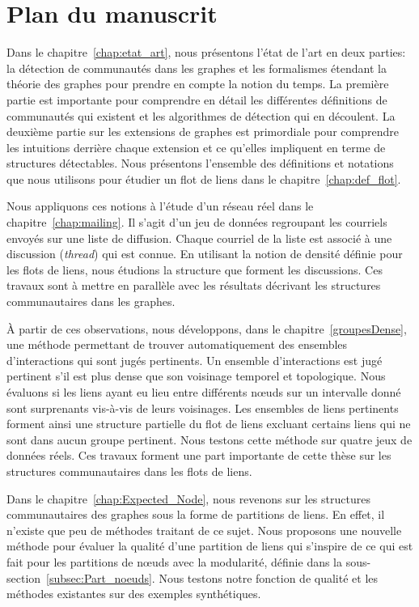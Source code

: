 \section*{Plan du manuscrit}


Dans le chapitre~\ref{chap:etat_art}, nous présentons l'état de l'art en deux parties: la détection de communautés dans les graphes et les formalismes étendant la théorie des graphes pour prendre en compte la notion du temps.
La première partie est importante pour comprendre en détail les différentes définitions de communautés qui existent et les algorithmes de détection qui en découlent.
La deuxième partie sur les extensions de graphes est primordiale pour comprendre les intuitions derrière chaque extension et ce qu'elles impliquent en terme de structures détectables.
Nous présentons l'ensemble des définitions et notations que nous utilisons pour étudier un flot de liens dans le chapitre~\ref{chap:def_flot}.

Nous appliquons ces notions à l'étude d'un réseau réel dans le chapitre~\ref{chap:mailing}.
Il s'agit d'un jeu de données regroupant les courriels envoyés sur une liste de diffusion.
Chaque courriel de la liste est associé à une discussion (\emph{thread}) qui est connue.
En utilisant la notion de densité définie pour les flots de liens, nous étudions la structure que forment les discussions.
Ces travaux sont à mettre en parallèle avec les résultats décrivant les structures communautaires dans les graphes.


\`A partir de ces observations, nous développons, dans le chapitre~\ref{groupesDense}, une méthode permettant de trouver automatiquement des ensembles d'interactions qui sont jugés pertinents.
Un ensemble d'interactions est jugé pertinent s’il est plus dense que son voisinage temporel et topologique.
Nous évaluons si les liens ayant eu lieu entre différents n\oe{}uds sur un intervalle donné sont surprenants vis-à-vis de leurs voisinages.
Les ensembles de liens pertinents forment ainsi une structure partielle du flot de liens excluant certains liens qui ne sont dans aucun groupe pertinent.
Nous testons cette méthode sur quatre jeux de données réels.
Ces travaux forment une part importante de cette thèse sur les structures communautaires dans les flots de liens.

Dans le chapitre~\ref{chap:Expected_Node}, nous revenons sur les structures communautaires des graphes sous la forme de partitions de liens.
En effet, il n'existe que peu de méthodes traitant de ce sujet.
Nous proposons une nouvelle méthode pour évaluer la qualité d'une partition de liens qui s'inspire de ce qui est fait pour les partitions de n\oe{}uds avec la modularité, définie dans la sous-section~\ref{subsec:Part_noeuds}.
Nous testons notre fonction de qualité et les méthodes existantes sur des exemples synthétiques.

